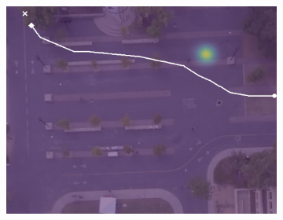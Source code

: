 \documentclass[letterpaper,10pt,conference]{ieeetran}
\begin{document}
\begin{figure}[t!]
\begin{subfigure}[t]{0.48\textwidth}
\begin{minipage}[c]{0.3\linewidth}
			\includegraphics[width=\linewidth]{./figures/bookstore/lstm_1_2_t=360.jpg}
		\end{minipage}
	

\end{subfigure}
\end{figure}
\end{document}

